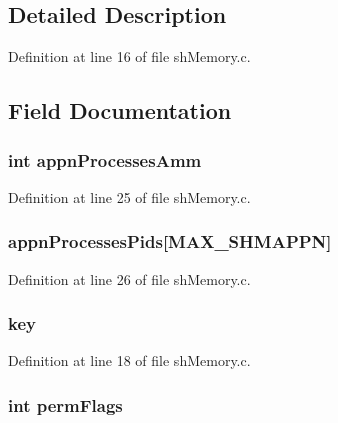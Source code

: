 \subsection{Detailed Description}


Definition at line 16 of file shMemory.c.



\subsection{Field Documentation}
\hypertarget{structsh_mem_aab6ea7924dbc5e67cbf5923d4226ea91}{
\subsubsection[{appnProcessesAmm}]{\setlength{\rightskip}{0pt plus 5cm}int {\bf appnProcessesAmm}}}
\label{structsh_mem_aab6ea7924dbc5e67cbf5923d4226ea91}


Definition at line 25 of file shMemory.c.

\hypertarget{structsh_mem_a5bb581de55dfe5f03f5b8b1646a93b38}{
\subsubsection[{appnProcessesPids}]{ {\bf appnProcessesPids}\mbox{[}MAX\_\-SHMAPPN\mbox{]}}}
\label{structsh_mem_a5bb581de55dfe5f03f5b8b1646a93b38}


Definition at line 26 of file shMemory.c.

\hypertarget{structsh_mem_ac8861193246fc34d8f29ac9d57b6791a}{
\subsubsection[{key}]{ {\bf key}}}
\label{structsh_mem_ac8861193246fc34d8f29ac9d57b6791a}


Definition at line 18 of file shMemory.c.

\hypertarget{structsh_mem_a720a6e55514a9c4aee4b913a7f871c31}{
\subsubsection[{permFlags}]{\setlength{\rightskip}{0pt plus 5cm}int {\bf permFlags}}}
\label{structsh_mem_a720a6e55514a9c4aee4b913a7f871c31}


